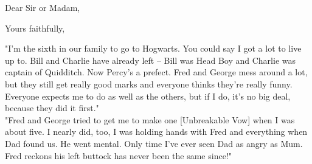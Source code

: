 \documentclass[11pt,a4paper,sans]{moderncv}        %
\begin{document}
% 


\clearpage
\date{April 8th, 2014}
\opening{Dear Sir or Madam,}
\closing{Yours faithfully,}
\makelettertitle

"I'm the sixth in our family to go to Hogwarts. You could say I got a lot to live up to. Bill and Charlie have already left – Bill was Head Boy and Charlie was captain of Quidditch. Now Percy's a prefect. Fred and George mess around a lot, but they still get really good marks and everyone thinks they're really funny. Everyone expects me to do as well as the others, but if I do, it's no big deal, because they did it first."\\
"Fred and George tried to get me to make one [Unbreakable Vow] when I was about five. I nearly did, too, I was holding hands with Fred and everything when Dad found us. He went mental. Only time I've ever seen Dad as angry as Mum. Fred reckons his left buttock has never been the same since!"

\makeletterclosing
\end{document}

